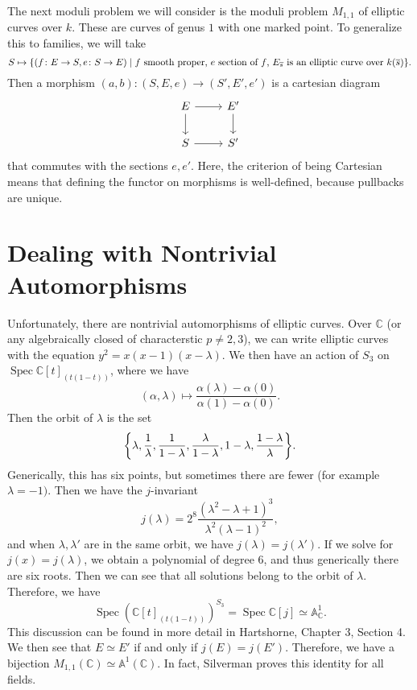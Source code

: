 \documentclass[leqno, openany]{memoir}
\theoremstyle{definition}
\theoremstyle{remark}
\theoremstyle{plain}
\theoremstyle{definition}
\theoremstyle{remark}
\newcommand{\A}{\mathbb{A}}
\newcommand{\C}{\mathbb{C}}
\newcommand{\ol}[1]{\overline{#1}}
\DeclareMathOperator{\Spec}{Spec}
\begin{document}
The next moduli problem we will consider is the moduli problem $M_{1,1}$ of
elliptic curves over $k$. These are curves of genus $1$ with one marked point.
To generalize this to families, we will take \[ S \mapsto \qty{(f \colon E \to
S, e \colon S \to E) \mid \text{$f$ smooth proper, $e$ section of $f$,
$E_{\ol{s}}$ is an elliptic curve over $k(\ol{s})$}}. \] Then a morphism $(a,b)
\colon (S,E,e) \to (S',E',e')$ is a cartesian diagram \begin{equation*}
    \begin{tikzcd} E \arrow{r} \arrow{d} & E' \arrow{d} \\ S \arrow{r} & S'
    \end{tikzcd} \end{equation*} that commutes with the sections $e,e'$. Here,
    the criterion of being Cartesian means that defining the functor on
    morphisms is well-defined, because pullbacks are unique.

\section{Dealing with Nontrivial Automorphisms}%
\label{sec:dealing_with_nontrivial_automorphisms}


Unfortunately, there are nontrivial automorphisms of elliptic curves. Over $\C$
(or any algebraically closed of characterstic $p \neq 2,3$), we can write
elliptic curves with the equation $y^2 = x(x-1)(x-\lambda)$. We then have an
action of $S_3$ on $\Spec \C[t]_{(t(1-t))}$, where we have \[ (\alpha, \lambda)
\mapsto \frac{\alpha(\lambda) - \alpha(0)}{\alpha(1) - \alpha(0)}. \] Then the
orbit of $\lambda$ is the set \[ \qty{ \lambda, \frac{1}{\lambda},
\frac{1}{1-\lambda}, \frac{\lambda}{1-\lambda}, 1-\lambda, \frac{1-
\lambda}{\lambda} }. \] Generically, this has six points, but sometimes there
are fewer (for example $\lambda = -1)$. Then we have the $j$-invariant \[
j(\lambda) = 2^8 \frac{(\lambda^2 - \lambda + 1)^3}{\lambda^2(\lambda - 1)^2},
\] and when $\lambda, \lambda'$ are in the same orbit, we have $j(\lambda) =
j(\lambda')$. If we solve for $j(x) = j(\lambda)$, we obtain a polynomial of
degree $6$, and thus generically there are six roots. Then we can see that all
solutions belong to the orbit of $\lambda$. Therefore, we have \[ \Spec
(\C[t]_{(t(1-t))})^{S_3} = \Spec \C[j] \simeq \A^1_{\C}. \] This discussion can
be found in more detail in Hartshorne, Chapter 3, Section 4. We then see that
$E \simeq E'$ if and only if $j(E) = j(E')$. Therefore, we have a bijection
$M_{1,1}(\C) \simeq \A^1(\C)$. In fact, Silverman proves this identity for all
fields.
\end{document}
